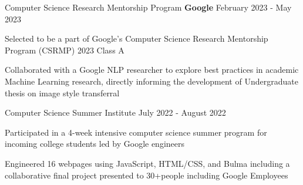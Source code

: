 
\begin{cventries}

  \cventry
    {Computer Science Research Mentorship Program}
    {\textbf{Google}}
    {}
    {February 2023 - May 2023}
    {
      \begin{cvitems}
        \item{Selected to be a part of Google’s Computer Science Research Mentorship Program (CSRMP) 2023 Class A}
        \item{Collaborated with a Google NLP researcher to explore best practices in academic Machine Learning research, directly informing the development of Undergraduate thesis on image style transferral}
      \end{cvitems}
    }

  \cventry
    {Computer Science Summer Institute}
    {}
    {}
    {July 2022 - August 2022}
    {
      \begin{cvitems}
        \item{Participated in a 4-week intensive computer science summer program for incoming college students led by Google engineers}
        \item{Engineered 16 webpages using JavaScript, HTML/CSS, and Bulma including a collaborative final project presented to 30+people including Google Employees}
      \end{cvitems}
    }

\end{cventries}
